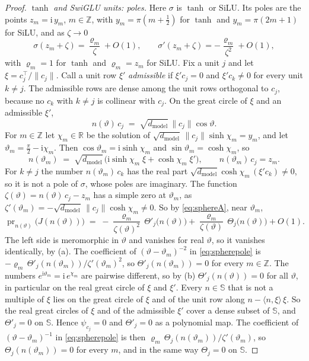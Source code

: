 \documentclass[10pt]{article}
\theoremstyle{definition}
\theoremstyle{remark}
\newcommand{\R}{\mathbb{R}}
\newcommand{\dm}{d_{\mathrm{model}}}
\newcommand{\norm}[1]{\lVert #1\rVert}
\begin{document}
\begin{proof}
\emph{$\tanh$ and SwiGLU units: poles.} Here $\sigma$ is $\tanh$ or SiLU. Its poles are the points $z_m = \mathrm i\,y_m$, $m \in \mathbb Z$, with $y_m = \pi(m + \tfrac12)$ for $\tanh$ and $y_m = \pi(2m+1)$ for SiLU, and as $\zeta \to 0$
\[
\sigma(z_m + \zeta) = \frac{\varrho_m}{\zeta} + O(1), \qquad \sigma'(z_m + \zeta) = -\frac{\varrho_m}{\zeta^2} + O(1),
\]
with $\varrho_m = 1$ for $\tanh$ and $\varrho_m = z_m$ for SiLU. Fix a unit $j$ and let $\xi = c_j^\top/\norm{c_j}$. Call a unit row $\xi'$ \emph{admissible} if $\xi'c_j = 0$ and $\xi'c_k \neq 0$ for every unit $k \neq j$. The admissible rows are dense among the unit rows orthogonal to $c_j$, because no $c_k$ with $k \neq j$ is collinear with $c_j$. On the great circle of $\xi$ and an admissible $\xi'$,
\[
n(\vartheta)\,c_j \;=\; \sqrt{\dm}\,\norm{c_j}\cos\vartheta .
\]
For $m \in \mathbb Z$ let $\chi_m \in \R$ be the solution of $\sqrt{\dm}\,\norm{c_j}\sinh\chi_m = y_m$, and let $\vartheta_m = \tfrac{\pi}{2} - \mathrm i\chi_m$. Then $\cos\vartheta_m = \mathrm i\sinh\chi_m$ and $\sin\vartheta_m = \cosh\chi_m$, so
\[
n(\vartheta_m) \;=\; \sqrt{\dm}\,\big(\mathrm i\sinh\chi_m\;\xi + \cosh\chi_m\;\xi'\big), \qquad n(\vartheta_m)\,c_j = z_m .
\]
For $k \neq j$ the number $n(\vartheta_m)\,c_k$ has the real part $\sqrt{\dm}\cosh\chi_m\,(\xi'c_k) \neq 0$, so it is not a pole of $\sigma$, whose poles are imaginary. The function $\zeta(\vartheta) = n(\vartheta)\,c_j - z_m$ has a simple zero at $\vartheta_m$, as $\zeta'(\vartheta_m) = -\sqrt{\dm}\,\norm{c_j}\cosh\chi_m \neq 0$. So by \eqref{eq:sphereA}, near $\vartheta_m$,
\begin{equation}\label{eq:spherepole}
\operatorname{pr}_{n(\vartheta)}\big(J(n(\vartheta))\big) \;=\; -\frac{\varrho_m}{\zeta(\vartheta)^2}\,\Theta'_j\big(n(\vartheta)\big) + \frac{\varrho_m}{\zeta(\vartheta)}\,\Theta_j\big(n(\vartheta)\big) + O(1).
\end{equation}
The left side is meromorphic in $\vartheta$ and vanishes for real $\vartheta$, so it vanishes identically, by (a). The coefficient of $(\vartheta - \vartheta_m)^{-2}$ in \eqref{eq:spherepole} is $-\varrho_m\,\Theta'_j(n(\vartheta_m))/\zeta'(\vartheta_m)^2$, so $\Theta'_j(n(\vartheta_m)) = 0$ for every $m \in \mathbb Z$. The numbers $e^{\mathrm i\vartheta_m} = \mathrm i\,e^{\chi_m}$ are pairwise different, so by (b) $\Theta'_j(n(\vartheta)) = 0$ for all $\vartheta$, in particular on the real great circle of $\xi$ and $\xi'$. Every $n \in \mathbb S$ that is not a multiple of $\xi$ lies on the great circle of $\xi$ and of the unit row along $n - \langle n, \xi\rangle\,\xi$. So the real great circles of $\xi$ and of the admissible $\xi'$ cover a dense subset of $\mathbb S$, and $\Theta'_j = 0$ on $\mathbb S$. Hence $\psi_{c_j} = 0$ and $\Theta'_j = 0$ as a polynomial map. The coefficient of $(\vartheta - \vartheta_m)^{-1}$ in \eqref{eq:spherepole} is then $\varrho_m\,\Theta_j(n(\vartheta_m))/\zeta'(\vartheta_m)$, so $\Theta_j(n(\vartheta_m)) = 0$ for every $m$, and in the same way $\Theta_j = 0$ on $\mathbb S$.


\end{proof}
\end{document}
